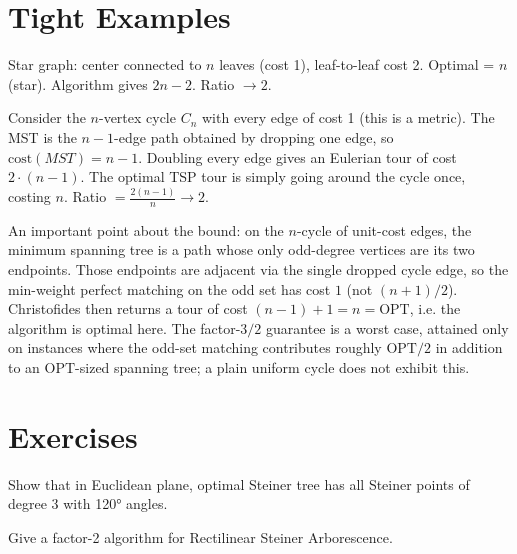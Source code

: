 \section{Tight Examples}

\begin{example}
Star graph: center connected to $n$ leaves (cost 1), leaf-to-leaf cost 2. Optimal = $n$ (star). Algorithm gives $2n-2$. Ratio $\to 2$.
\end{example}

\begin{example}
Consider the $n$-vertex cycle $C_n$ with every edge of cost 1 (this is a metric). The MST is the $n-1$-edge path obtained by dropping one edge, so $\text{cost}(MST) = n-1$. Doubling every edge gives an Eulerian tour of cost $2 \cdot (n-1)$. The optimal TSP tour is simply going around the cycle once, costing $n$. Ratio $= \frac{2(n-1)}{n} \to 2$.
\end{example}

\begin{example}[Christofides]
An important point about the bound: on the $n$-cycle of unit-cost edges, the minimum spanning tree is a path whose only odd-degree vertices are its two endpoints. Those endpoints are adjacent via the single dropped cycle edge, so the min-weight perfect matching on the odd set has cost $1$ (not $(n+1)/2$). Christofides then returns a tour of cost $(n-1) + 1 = n = \text{OPT}$, i.e. the algorithm is optimal here. The factor-$3/2$ guarantee is a worst case, attained only on instances where the odd-set matching contributes roughly $\text{OPT}/2$ in addition to an $\text{OPT}$-sized spanning tree; a plain uniform cycle does not exhibit this.
\end{example}

\section{Exercises}
\begin{exercise}
Show that in Euclidean plane, optimal Steiner tree has all Steiner points of degree 3 with 120° angles.
\end{exercise}
\begin{exercise}
Give a factor-2 algorithm for Rectilinear Steiner Arborescence.
\end{exercise}

